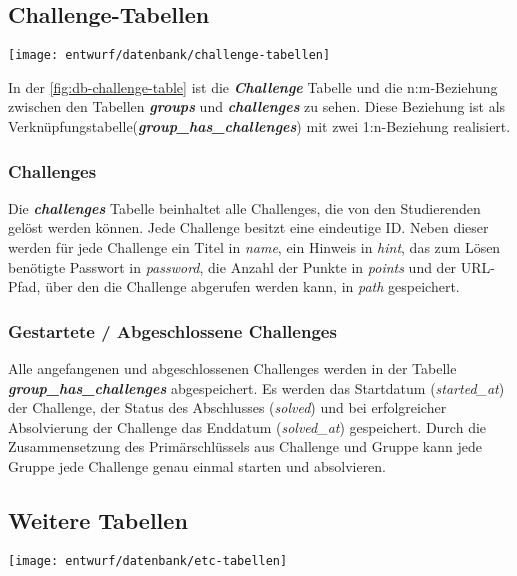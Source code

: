 \clearpage
\subsection{Challenge-Tabellen}
\begin{center}
	\texttt{[image: entwurf/datenbank/challenge-tabellen]}
	\label{fig:db-challenge-table}
\end{center}
In der \autoref{fig:db-challenge-table} ist die \textbf{\textit{Challenge}} Tabelle und die n:m-Beziehung zwischen den \linebreak Tabellen \textbf{\textit{groups}} und \textbf{\textit{challenges}} zu sehen. Diese Beziehung ist als Verknüpfungstabelle\linebreak (\textbf{\textit{group\_has\_challenges}}) mit zwei 1:n-Beziehung realisiert.

\subsubsection{Challenges}
Die \textbf{\textit{challenges}} Tabelle beinhaltet alle Challenges, die von den Studierenden gelöst werden können. Jede Challenge besitzt eine eindeutige ID. Neben dieser werden für jede Challenge ein Titel in \textit{name}, ein Hinweis in \textit{hint}, das zum Lösen benötigte Passwort in \textit{password}, die Anzahl der Punkte in \textit{points} und der URL-Pfad, über den die Challenge abgerufen werden kann, in \textit{path} gespeichert.

\subsubsection{Gestartete / Abgeschlossene Challenges}
Alle angefangenen und abgeschlossenen Challenges werden in der Tabelle \linebreak
\textbf{\textit{group\_has\_challenges}} abgespeichert. Es werden das Startdatum (\textit{started\_at}) der Challenge, der Status des Abschlusses (\textit{solved}) und bei erfolgreicher Absolvierung der Challenge das Enddatum (\textit{solved\_at}) gespeichert. Durch die Zusammensetzung des Primärschlüssels aus Challenge und Gruppe kann jede Gruppe jede Challenge genau einmal starten und absolvieren.

\subsection{Weitere Tabellen}
\begin{center}
	\texttt{[image: entwurf/datenbank/etc-tabellen]}
	\label{fig:db-etc-table}
\end{center}

